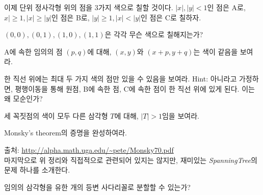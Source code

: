 이제 단위 정사각형 위의 점을 3가지 색으로 칠할 것이다. $|x|, |y|<1$인 점은 A로, $x|\geq 1, |x|\geq |y|$인 점은 B로, $|y|\geq 1, |x|<|y|$인 점은 C로 칠하자. 
\begin{exercise}
    $(0, 0), (0, 1), (1, 0), (1, 1)$은 각각 무슨 색으로 칠해지는가?
\end{exercise}
\begin{exercise}
    A에 속한 임의의 점 $(p, q)$에 대해, $(x, y)$와 $(x+p, y+q)$는 색이 같음을 보여라. 
\end{exercise}
\begin{exercise}
    한 직선 위에는 최대 두 가지 색의 점만 있을 수 있음을 보여라. Hint: 아니라고 가정하면, 평행이동을 통해 원점, B에 속한 점, C에 속한 점이 한 직선 위에 있게 된다. 이는 왜 모순인가?
\end{exercise}
\begin{exercise}
    세 꼭짓점의 색이 모두 다른 삼각형 $T$에 대해, $|T|>1$임을 보여라. 
\end{exercise}
\begin{exercise}
    Monsky's theorem의 증명을 완성하여라. 
\end{exercise}
출처: \url{http://alpha.math.uga.edu/~pete/Monsky70.pdf} \\
마지막으로 위 정리와 직접적으로 관련되어 있지는 않지만, 재미있는 \textit{SpanningTree}의 문제 하나를 소개한다.
\begin{question}
    임의의 삼각형을 유한 개의 등변 사다리꼴로 분할할 수 있는가?
\end{question}
